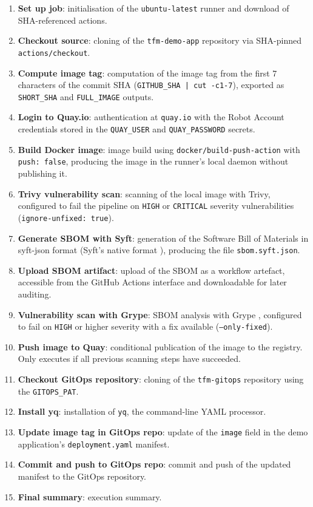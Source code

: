\begin{enumerate}
  \item \textbf{Set up job}: initialisation of the \texttt{ubuntu-latest} runner and download of SHA-referenced actions.
  \item \textbf{Checkout source}: cloning of the \texttt{tfm-demo-app} repository via SHA-pinned \texttt{actions/checkout}.
  \item \textbf{Compute image tag}: computation of the image tag from the first 7 characters of the commit SHA (\texttt{GITHUB\_SHA | cut -c1-7}), exported as \texttt{SHORT\_SHA} and \texttt{FULL\_IMAGE} outputs.
  \item \textbf{Login to Quay.io}: authentication at \texttt{quay.io} with the Robot Account credentials stored in the \texttt{QUAY\_USER} and \texttt{QUAY\_PASSWORD} secrets.
  \item \textbf{Build Docker image}: image build using \texttt{docker/build-push-action} with \texttt{push:\,false}, producing the image in the runner's local daemon without publishing it.
  \item \textbf{Trivy vulnerability scan}: scanning of the local image with Trivy, configured to fail the pipeline on \texttt{HIGH} or \texttt{CRITICAL} severity vulnerabilities (\texttt{ignore-unfixed: true}).
  \item \textbf{Generate SBOM with Syft}: generation of the Software Bill of Materials in syft-json format (Syft's native format \cite{syft_docs}), producing the file \texttt{sbom.syft.json}.
  \item \textbf{Upload SBOM artifact}: upload of the SBOM as a workflow artefact, accessible from the GitHub Actions interface and downloadable for later auditing.
  \item \textbf{Vulnerability scan with Grype}: SBOM analysis with Grype \cite{grype_docs}, configured to fail on \texttt{HIGH} or higher severity with a fix available (\texttt{--only-fixed}).
  \item \textbf{Push image to Quay}: conditional publication of the image to the registry. Only executes if all previous scanning steps have succeeded.
  \item \textbf{Checkout GitOps repository}: cloning of the \texttt{tfm-gitops} repository using the \texttt{GITOPS\_PAT}.
  \item \textbf{Install yq}: installation of \texttt{yq}, the command-line YAML processor.
  \item \textbf{Update image tag in GitOps repo}: update of the \texttt{image} field in the demo application's \texttt{deployment.yaml} manifest.
  \item \textbf{Commit and push to GitOps repo}: commit and push of the updated manifest to the GitOps repository.
  \item \textbf{Final summary}: execution summary.
\end{enumerate}

